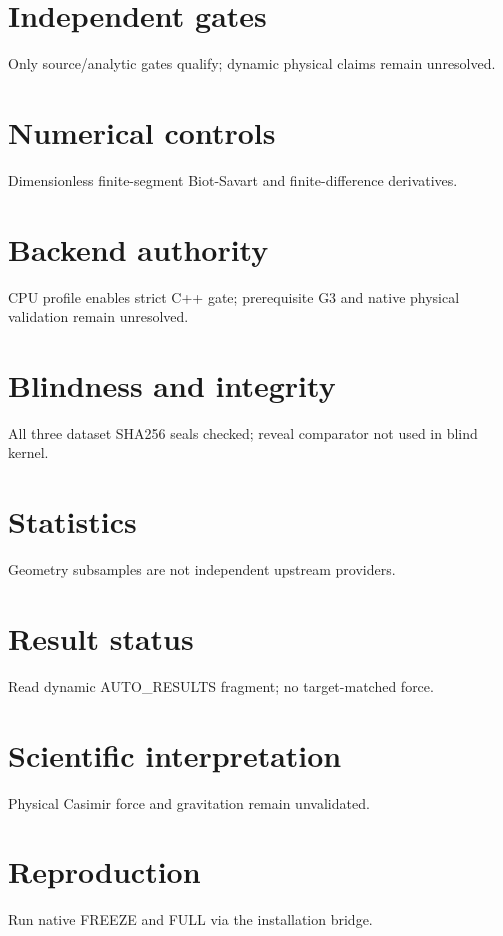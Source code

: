 \documentclass[10pt,a4paper]{article}
\begin{document}
\section{Independent gates}
Only source/analytic gates qualify; dynamic physical claims remain unresolved.
\section{Numerical controls}
Dimensionless finite-segment Biot-Savart and finite-difference derivatives.
\section{Backend authority}
CPU profile enables strict C++ gate; prerequisite G3 and native physical validation remain unresolved.
\section{Blindness and integrity}
All three dataset SHA256 seals checked; reveal comparator not used in blind kernel.
\section{Statistics}
Geometry subsamples are not independent upstream providers.
\section{Result status}
Read dynamic AUTO\_RESULTS fragment; no target-matched force.

\section{Scientific interpretation}
Physical Casimir force and gravitation remain unvalidated.
\section{Reproduction}
Run native FREEZE and FULL via the installation bridge.
\end{document}
